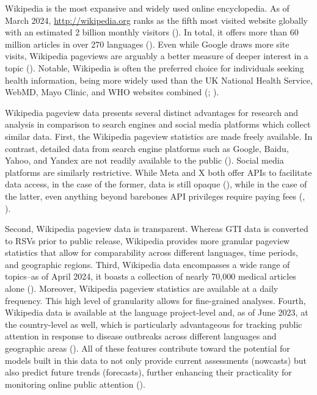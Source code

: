 \documentclass[
  12pt,
]{article}
\begin{document}
Wikipedia is the most expansive and widely used online encyclopedia. As
of March 2024, \url{http://wikipedia.org} ranks as the fifth most
visited website globally with an estimated 2 billion monthly visitors
(). In
total, it offers more than 60 million articles in over 270 languages
(). Even while Google draws
more site visits, Wikipedia pageviews are arguably a better measure of
deeper interest in a topic (). Notable, Wikipedia is often the preferred choice for individuals
seeking health information, being more widely used than the UK National
Health Service, WebMD, Mayo Clinic, and WHO websites combined
(;
).

Wikipedia pageview data presents several distinct advantages for
research and analysis in comparison to search engines and social media
platforms which collect similar data. First, the Wikipedia pageview
statistics are made freely available. In contrast, detailed data from
search engine platforms such as Google, Baidu, Yahoo, and Yandex are not
readily available to the public (). Social media platforms are similarly restrictive. While Meta
and X both offer APIs to facilitate data access, in the case of the
former, data is still opaque (), while in the case of the latter, even
anything beyond barebones API privileges require paying fees
(, \textbar).

Second, Wikipedia pageview data is transparent. Whereas GTI data is
converted to RSVs prior to public release, Wikipedia provides more
granular pageview statistics that allow for comparability across
different languages, time periods, and geographic regions. Third,
Wikipedia data encompasses a wide range of topics--as of April 2024, it
boasts a collection of nearly 70,000 medical articles alone
(). Moreover,
Wikipedia pageview statistics are available at a daily frequency. This
high level of granularity allows for fine-grained analyses. Fourth,
Wikipedia data is available at the language project-level and, as of
June 2023, at the country-level as well, which is particularly
advantageous for tracking public attention in response to disease
outbreaks across different languages and geographic areas
(). All of these
features contribute toward the potential for models built in this data
to not only provide current assessments (nowcasts) but also predict
future trends (forecasts), further enhancing their practicality for
monitoring online public attention ().
\end{document}
